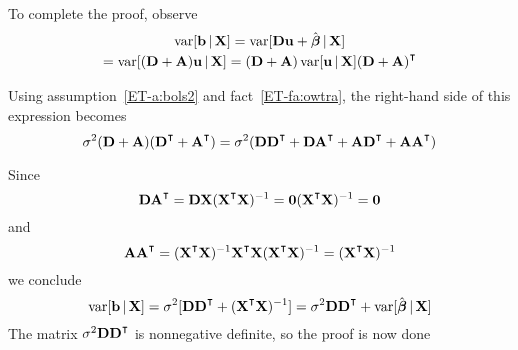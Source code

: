 \begin{frame}

    To complete the proof, observe
    \begin{multline*}
    \var [ \boldb \given \boldX]
    = \var[ \boldD \boldu + \hboldbeta \given \boldX ]
    \\ = \var[ (\boldD + \boldA ) \boldu \given \boldX ] 
     = (\boldD + \boldA ) \var[ \boldu \given \boldX ] (\boldD + \boldA )^\T
    \end{multline*}
    
    \vspace{.7em}
    Using assumption~\ref{ET-a:bols2} and fact~\ref{ET-fa:owtra}, the right-hand
    side of this expression becomes
    \begin{equation*}
        \sigma^2 (\boldD + \boldA )(\boldD^\T + \boldA^\T)
        = \sigma^2 (\boldD \boldD^\T + \boldD \boldA^\T + \boldA \boldD^\T + \boldA \boldA^\T)
    \end{equation*}
    

\end{frame}

\begin{frame}

    \vspace{2em}
    Since 
    \begin{equation*}
        \boldD \boldA^\T = \boldD \boldX (\boldX^\T \boldX)^{-1} 
        = \boldzero (\boldX^\T \boldX)^{-1}
        = \boldzero 
    \end{equation*}
    and 
    \begin{equation*}
        \boldA \boldA^\T
        =  (\boldX^\T \boldX)^{-1} \boldX^\T \boldX (\boldX^\T \boldX)^{-1} 
        = (\boldX^\T \boldX)^{-1} 
    \end{equation*}
    we conclude
    \begin{equation*}
    \var [ \boldb \given \boldX]
    = \sigma^2 [\boldD \boldD^\T + (\boldX^\T \boldX)^{-1}]
    = \sigma^2 \boldD \boldD^\T + \var [ \hboldbeta \given \boldX]
    \end{equation*}
    The matrix $\sigma^2 \boldD \boldD^\T$ is nonnegative definite, so the proof
    is now done \qedsymbol
    
\end{frame}

